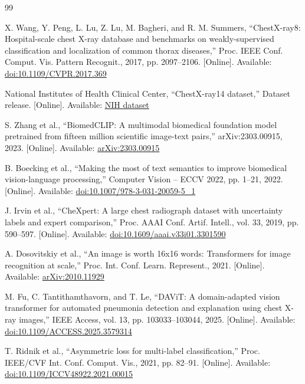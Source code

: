 \documentclass[conference,letterpaper]{IEEEtran}
\begin{document}
\begin{thebibliography}{99}

X. Wang, Y. Peng, L. Lu, Z. Lu, M. Bagheri, and R. M. Summers, ``ChestX-ray8: Hospital-scale chest X-ray database and benchmarks on weakly-supervised classification and localization of common thorax diseases,'' Proc. IEEE Conf. Comput. Vis. Pattern Recognit., 2017, pp. 2097--2106. [Online]. Available: \href{https://doi.org/10.1109/CVPR.2017.369}{doi:10.1109/CVPR.2017.369}

National Institutes of Health Clinical Center, ``ChestX-ray14 dataset,'' Dataset release. [Online]. Available: \href{https://nihcc.app.box.com/v/ChestXray-NIHCC}{NIH dataset}

S. Zhang et al., ``BiomedCLIP: A multimodal biomedical foundation model pretrained from fifteen million scientific image-text pairs,'' arXiv:2303.00915, 2023. [Online]. Available: \href{https://arxiv.org/abs/2303.00915}{arXiv:2303.00915}

B. Boecking et al., ``Making the most of text semantics to improve biomedical vision-language processing,'' Computer Vision -- ECCV 2022, pp. 1--21, 2022. [Online]. Available: \href{https://doi.org/10.1007/978-3-031-20059-5_1}{doi:10.1007/978-3-031-20059-5\_1}

J. Irvin et al., ``CheXpert: A large chest radiograph dataset with uncertainty labels and expert comparison,'' Proc. AAAI Conf. Artif. Intell., vol. 33, 2019, pp. 590--597. [Online]. Available: \href{https://doi.org/10.1609/aaai.v33i01.3301590}{doi:10.1609/aaai.v33i01.3301590}

A. Dosovitskiy et al., ``An image is worth 16x16 words: Transformers for image recognition at scale,'' Proc. Int. Conf. Learn. Represent., 2021. [Online]. Available: \href{https://arxiv.org/abs/2010.11929}{arXiv:2010.11929}

M. Fu, C. Tantithamthavorn, and T. Le, ``DAViT: A domain-adapted vision transformer for automated pneumonia detection and explanation using chest X-ray images,'' IEEE Access, vol. 13, pp. 103033--103044, 2025. [Online]. Available: \href{https://doi.org/10.1109/ACCESS.2025.3579314}{doi:10.1109/ACCESS.2025.3579314}

T. Ridnik et al., ``Asymmetric loss for multi-label classification,'' Proc. IEEE/CVF Int. Conf. Comput. Vis., 2021, pp. 82--91. [Online]. Available: \href{https://doi.org/10.1109/ICCV48922.2021.00015}{doi:10.1109/ICCV48922.2021.00015}


\end{thebibliography}
\end{document}
